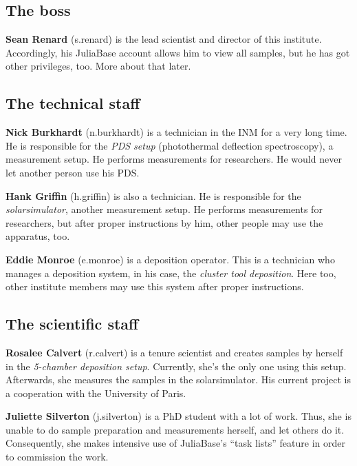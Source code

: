 \documentclass[a4paper,11pt,english]{sphinxmanual}
\begin{document}

\subsection{The boss}
\label{demo:the-boss}\label{demo:index-1}
\textbf{Sean Renard} (s.renard) is the lead scientist and director of this
institute.  Accordingly, his JuliaBase account allows him to view all samples,
but he has got other privileges, too.  More about that later.


\subsection{The technical staff}
\label{demo:the-technical-staff}
\textbf{Nick Burkhardt} (n.burkhardt) is a technician in the INM for a very long time.  He is
responsible for the \emph{PDS setup} (photothermal deflection spectroscopy), a
measurement setup.  He performs measurements for researchers.  He would never
let another person use his PDS.

\textbf{Hank Griffin} (h.griffin) is also a technician.  He is responsible for the
\emph{solarsimulator}, another measurement setup.  He performs measurements for
researchers, but after proper instructions by him, other people may use the
apparatus, too.

\textbf{Eddie Monroe} (e.monroe) is a deposition operator.  This is a technician who
manages a deposition system, in his case, the \emph{cluster tool deposition}.  Here
too, other institute members may use this system after proper instructions.


\subsection{The scientific staff}
\label{demo:the-scientific-staff}
\textbf{Rosalee Calvert} (r.calvert) is a tenure scientist and creates samples by
herself in the \emph{5-chamber deposition setup}.  Currently, she's the only one
using this setup.  Afterwards, she measures the samples in the solarsimulator.
His current project is a cooperation with the University of Paris.

\textbf{Juliette Silverton} (j.silverton) is a PhD student with a lot of work.
Thus, she is unable to do sample preparation and measurements herself, and let
others do it.  Consequently, she makes intensive use of JuliaBase's “task
lists” feature in order to commission the work.
\end{document}
